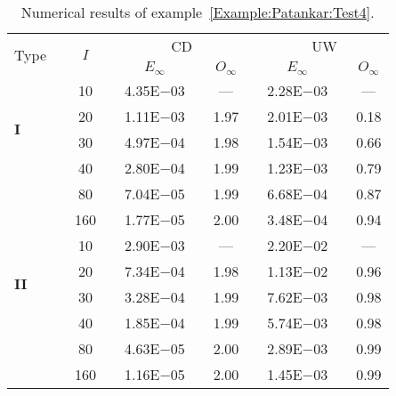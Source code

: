 {\renewcommand{\baselinestretch}{1.0}
\begin{table}[H]
\caption{Numerical results of example~\ref{Example:Patankar:Test4}.}

\setlength{\tabcolsep}{5pt}
\centering
\begin{tabular}{@{}l c c c c c c c c c c@{}}
\toprule
\multirow{2}{*}{Type} &  & \multirow{2}{*}{$I$} &  & \multicolumn{3}{c}{CD} &  & \multicolumn{3}{c}{UW} \\
\cline{5-7}
\cline{9-11}
 & & & & $E_{\infty}$ & & $O_{\infty}$ & & $E_{\infty}$ & & $O_{\infty}$\\
\midrule
\multirow{4}{*}{\textbf{I}} 
 & & 10 & & 4.35E$-$03 & & --- & & 2.28E$-$03 & & ---\\
 & & 20 & & 1.11E$-$03 & & 1.97 & & 2.01E$-$03 & & 0.18\\
 & & 30 & & 4.97E$-$04 & & 1.98 & & 1.54E$-$03 & & 0.66\\
 & & 40 & & 2.80E$-$04 & & 1.99 & & 1.23E$-$03 & & 0.79\\
 & & 80 & & 7.04E$-$05 & & 1.99 & & 6.68E$-$04 & & 0.87\\
 & & 160 & & 1.77E$-$05 & & 2.00 & & 3.48E$-$04 & & 0.94\\
\midrule
\multirow{4}{*}{\textbf{II}} 
 & & 10 & & 2.90E$-$03 & & --- & & 2.20E$-$02 & & ---\\
 & & 20 & & 7.34E$-$04 & & 1.98 & & 1.13E$-$02 & & 0.96\\
 & & 30 & & 3.28E$-$04 & & 1.99 & & 7.62E$-$03 & & 0.98\\
 & & 40 & & 1.85E$-$04 & & 1.99 & & 5.74E$-$03 & & 0.98\\
 & & 80 & & 4.63E$-$05 & & 2.00 & & 2.89E$-$03 & & 0.99\\
 & & 160 & & 1.16E$-$05 & & 2.00 & & 1.45E$-$03 & & 0.99\\
\bottomrule
\end{tabular}
\label{Table:Patankar:Test4}
\end{table}}
